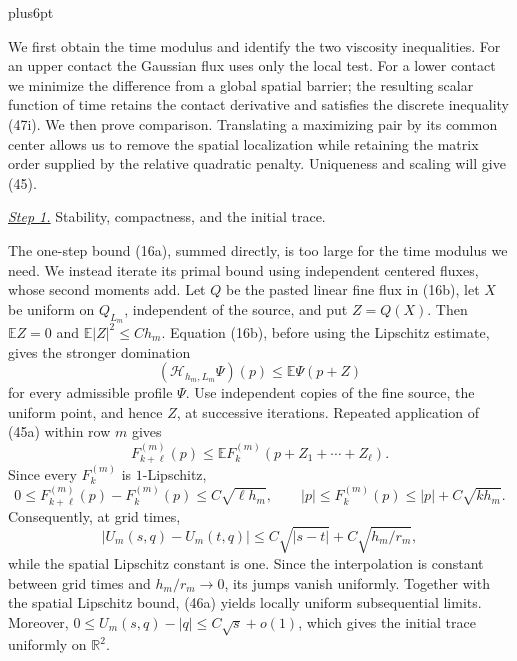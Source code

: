 \documentclass[11pt,reqno]{amsart}
\makeatletter
\theoremstyle{plain}
\theoremstyle{definition}
\theoremstyle{remark}
\renewenvironment{proof}[1][\proofname]{%
  \par
  \pushQED{\qed}%
  \normalfont
  \topsep6pt plus6pt\relax
  \trivlist
  \item[\hskip\labelsep\slshape #1\@addpunct{.}]%
  \ignorespaces
}{%
  \popQED
  \endtrivlist
  \@endpefalse
}
\DeclareRobustCommand{\qed}{%
  \leavevmode\unskip\penalty9999\hbox{}\nobreak
  \ifmmode
    \makebox[0pt][l]{\qquad\hbox{\qedsymbol}}%
  \else
    \qquad\hbox{\qedsymbol}%
  \fi
}
\renewcommand{\qedsymbol}{\rule[.47pt]{4pt}{6pt}}
\numberwithin{equation}{section}
\newcommand{\1}{\mathbf 1}
\makeatother
\begin{document}
\begin{proof}
We first obtain the time modulus and identify the two viscosity
inequalities.  For an upper contact the Gaussian flux uses only the
local test.  For a lower contact we minimize the difference from a
global spatial barrier; the resulting scalar function of time retains
the contact derivative and satisfies the discrete inequality (47i).
We then prove comparison.  Translating a maximizing pair by its
common center allows us to remove the spatial localization while
retaining the matrix order supplied by the relative quadratic
penalty.  Uniqueness and scaling will give (45).

\smallskip\noindent
\underline{\textit{Step 1.}} Stability, compactness, and the initial trace.

The one-step bound (16a), summed directly, is too large for the time
modulus we need.  We instead iterate its primal bound using
independent centered fluxes, whose second moments add.
Let $Q$ be the pasted linear fine flux in (16b), let $X$ be uniform
on $Q_{L_m}$, independent of the source, and put $Z=Q(X)$.  Then
$\mathbb EZ=0$ and
$\mathbb E|Z|^2\leq Ch_ m$.  Equation (16b), before using the
Lipschitz estimate, gives the stronger domination
\begin{equation}
(\mathcal H_ {h_ m,L_ m}\Psi)(p)\leq\mathbb E\Psi(p+Z)
\tag{45a}
\end{equation}
for every admissible profile $\Psi$.  Use independent copies of the
fine source, the uniform point, and hence $Z$, at successive
iterations.  Repeated application of (45a) within row $m$ gives
\begin{equation*}
F_{k+\ell}^{(m)}(p)
\leq\mathbb E F_k^{(m)}(p+Z_ 1+\cdots+Z_ \ell).
\end{equation*}
Since every $F_k^{(m)}$ is $1$-Lipschitz,
\begin{equation}
0\leq F_{k+\ell}^{(m)}(p)-F_k^{(m)}(p)\leq C\sqrt{\ell h_m},
\qquad |p|\leq F_k^{(m)}(p)\leq|p|+C\sqrt{k h_m}.
\tag{46}
\end{equation}
Consequently, at grid times,
\begin{equation}
|U_ m(s,q)-U_ m(t,q)|
\leq C\sqrt{|s-t|}+C\sqrt{h_ m/r_ m},
\tag{46a}
\end{equation}
while the spatial Lipschitz constant is one.  Since the interpolation
is constant between grid times and $h_m/r_m\to0$, its jumps vanish
uniformly.  Together with the spatial Lipschitz bound, (46a) yields
locally uniform subsequential limits.  Moreover,
$0\leq U_ m(s,q)-|q|\leq C\sqrt s+o(1)$, which gives the initial
trace uniformly on $\mathbb R^2$.


\end{proof}
\end{document}
